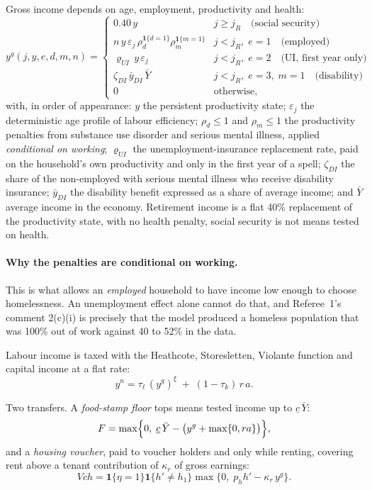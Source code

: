 \documentclass[11pt]{article}
\newcommand{\ind}[1]{\mathbf{1}\{#1\}}
\begin{document}
Gross income depends on age, employment, productivity and health:
\begin{equation}
y^{g}(j,y,e,d,m,n)=
\begin{cases}
0.40\,y & j\ge j_{R} \quad\text{(social security)}\\[2pt]
n\,y\,\varepsilon_j\,\rho_{d}^{\ind{d=1}}\rho_{m}^{\ind{m=1}} & j<j_{R},\;e=1 \quad\text{(employed)}\\[2pt]
\varrho_{UI}\,y\,\varepsilon_j & j<j_{R},\;e=2 \quad\text{(UI, first year only)}\\[2pt]
\zeta_{DI}\,\bar y_{DI}\,\bar Y & j<j_{R},\;e=3,\;m=1 \quad\text{(disability)}\\[2pt]
0 & \text{otherwise,}
\end{cases}
\label{eq:income}
\end{equation}
with, in order of appearance: $y$ the persistent productivity state;
$\varepsilon_j$ the deterministic age profile of labour efficiency;
$\rho_{d}\le1$ and $\rho_{m}\le1$ the productivity penalties from substance use
disorder and serious mental illness, applied \emph{conditional on working};
$\varrho_{UI}$ the unemployment-insurance replacement rate, paid on the
household's own productivity and only in the first year of a spell;
$\zeta_{DI}$ the share of the non-employed with serious mental illness who
receive disability insurance; $\bar y_{DI}$ the disability benefit expressed as
a share of average income; and $\bar Y$ average income in the economy.
Retirement income is a flat 40\% replacement of the productivity state, with no
health penalty, social security is not means tested on health.

\paragraph{Why the penalties are conditional on working.} This is what allows an
\emph{employed} household to have income low enough to choose homelessness. An
unemployment effect alone cannot do that, and Referee~1's comment 2(c)(i) is
precisely that the model produced a homeless population that was 100\% out of
work against 40 to 52\% in the data.

Labour income is taxed with the Heathcote, Storesletten, Violante function and
capital income at a flat rate:
\begin{equation}
y^{n}=\tau_{\ell}\,(y^{g})^{\xi}\;+\;(1-\tau_k)\,r\,a .
\label{eq:aftertax}
\end{equation}

Two transfers. A \emph{food-stamp floor} tops means tested income up to
$\underline c\,\bar Y$:
\begin{equation}
F=\max\Bigl\{0,\;\underline c\,\bar Y-\bigl(y^{g}+\max\{0,ra\}\bigr)\Bigr\},
\label{eq:food}
\end{equation}
and a \emph{housing voucher}, paid to voucher holders and only while renting,
covering rent above a tenant contribution of $\kappa_r$ of gross earnings:
\begin{equation}
V\!ch=\ind{\eta=1}\ind{h'\neq h_1}\max\bigl\{0,\;p_h h'-\kappa_r\,y^{g}\bigr\}.
\label{eq:voucher}
\end{equation}
\end{document}
